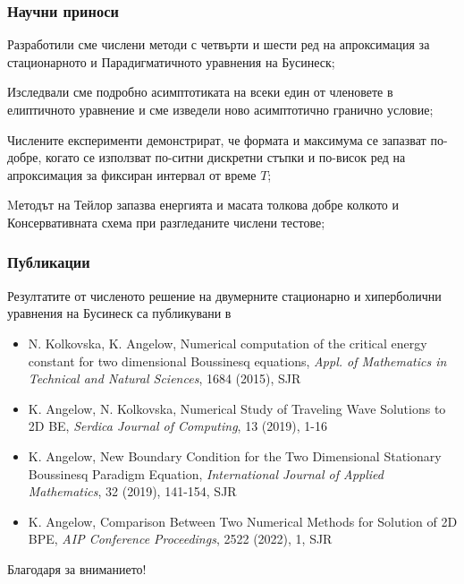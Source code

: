 \documentclass{beamer}
\begin{document}
\begin{frame}
\frametitle{Научни приноси}

\begin{itemize}
{\small
  \item Разработили сме числени методи с четвърти и шести ред на апроксимация за стационарното и Парадигматичното уравнения на Бусинеск;
  \item Изследвали сме подробно асимптотиката на всеки един от членовете в елиптичното уравнение и сме изведели ново асимптотично гранично условие; 
  \item Числените експерименти демонстрират, че формата и максимума се запазват по-добре, когато се използват по-ситни дискретни стъпки и по-висок ред на апроксимация за фиксиран интервал от време $T$;
  \item Mетодът на Тейлор запазва енергията и масата толкова добре колкото и Консервативната схема при разгледаните числени тестове;
}
\end{itemize}

\end{frame}


\begin{frame}
\frametitle{Публикации}

Резултатите от численото решение на двумерните стационарно и хиперболични уравнения на Бусинеск са
публикувани в
\begin{itemize}
  \item N. Kolkovska, K. Angelow, Numerical computation of the critical energy constant for two dimensional Boussinesq equations, {\it Appl. of Mathematics in Technical and Natural Sciences}, 1684 (2015), SJR
  \item K. Angelow, N. Kolkovska, Numerical Study of Traveling Wave Solutions to 2D BE, {\it Serdica Journal of Computing}, 13 (2019), 1-16
  \item K. Angelow, New Boundary Condition for the Two Dimensional Stationary Boussinesq Paradigm Equation, {\it International Journal of Applied Mathematics}, 32 (2019), 141-154, SJR
   \item K. Angelow, Comparison Between Two Numerical Methods for Solution of 2D BPE, {\it AIP Conference Proceedings}, 2522 (2022), 1, SJR
\end{itemize}

\end{frame}


\begin{frame}

{\Large \center Благодаря за вниманието!}


\end{frame}
\end{document}
